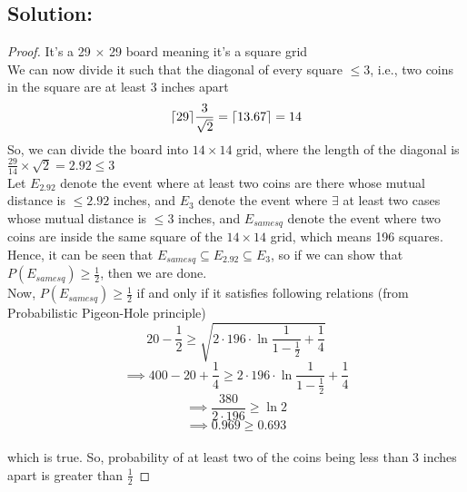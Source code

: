 \documentclass{article}
\theoremstyle{definition}
\DeclarePairedDelimiter\ceil{\lceil}{\rceil}
\begin{document}
\subsection{Solution:}
\begin{proof}
    
It's a 29 $\times$ 29 board meaning it's a square grid\\
We can now divide it such that the diagonal of every square $\leq 3$, i.e., two coins in the square are at least 3 inches apart\\
\[
\ceil{29}{\frac{3}{\sqrt{2}}} = \ceil{13.67}{} = 14
\]
So, we can divide the board into $14 \times 14$ grid, where the length of the diagonal is $\frac{29}{14} \times \sqrt{2} = 2.92 \leq 3$\\
Let $E_{2.92}$ denote the event where at least two coins are there whose mutual distance is $\leq 2.92$ inches, and $E_{3}$ denote the event where $\exists$ at least two cases whose mutual distance is $\leq 3$ inches, and $E_{same sq}$ denote the event where two coins are inside the same square of the $14 \times 14$ grid, which means 196 squares.\\
Hence, it can be seen that $E_{same sq} \subseteq E_{2.92} \subseteq E_3$, so if we can show that $P(E_{same sq}) \geq \frac{1}{2}$, then we are done.\\
Now, $P(E_{same sq}) \geq \frac{1}{2}$ if and only if it satisfies following relations (from Probabilistic Pigeon-Hole principle)
\[
20 - \frac{1}{2} \geq \sqrt{2 \cdot 196 \cdot \ln{\frac{1}{1 - \frac{1}{2}}} + \frac{1}{4}}
\]
\[
\implies 400 -20 + \frac{1}{4} \geq 2 \cdot 196 \cdot \ln{\frac{1}{1 - \frac{1}{2}}} + \frac{1}{4}
\]
\[
\implies
\frac{380}{2 \cdot 196} \geq \ln2
\]
\[
\implies
0.969 \geq 0.693
\]\\
which is true. So, probability of at least two of the coins being less than 3 inches apart is greater than $\frac{1}{2}$


\end{proof}
\end{document}
